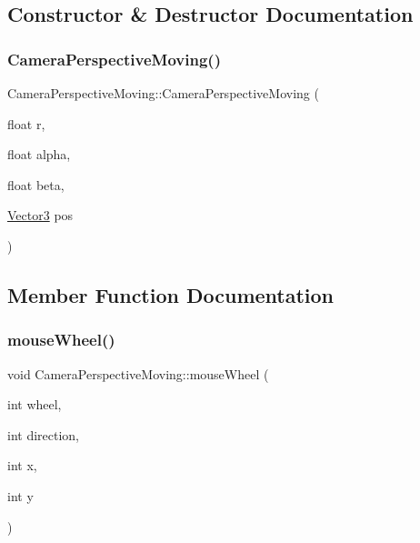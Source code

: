 \subsection{Constructor \& Destructor Documentation}
\mbox{\label{class_camera_perspective_moving_a61a3b32e7c149c9aa7091303f831d6c1}} 
\subsubsection{\texorpdfstring{Camera\+Perspective\+Moving()}{CameraPerspectiveMoving()}}
{\footnotesize\ttfamily Camera\+Perspective\+Moving\+::\+Camera\+Perspective\+Moving (\begin{DoxyParamCaption}\item[{float}]{r,  }\item[{float}]{alpha,  }\item[{float}]{beta,  }\item[{\hyperlink{class_vector3}{Vector3}}]{pos }\end{DoxyParamCaption})\hspace{0.3cm}{\ttfamily [inline]}}



\subsection{Member Function Documentation}
\mbox{\label{class_camera_perspective_moving_a7feb0b10588b45d72c894b1366da5811}} 
\subsubsection{\texorpdfstring{mouse\+Wheel()}{mouseWheel()}}
{\footnotesize\ttfamily void Camera\+Perspective\+Moving\+::mouse\+Wheel (\begin{DoxyParamCaption}\item[{int}]{wheel,  }\item[{int}]{direction,  }\item[{int}]{x,  }\item[{int}]{y }\end{DoxyParamCaption})\hspace{0.3cm}{\ttfamily [inline]}}

